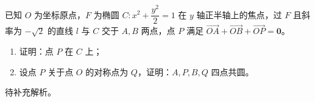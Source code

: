 \begin{prob}[source={2011大纲卷理}, topic={椭圆}, score=12]
已知 $O$ 为坐标原点，$F$ 为椭圆 $C: x^2 + \dfrac{y^2}{2} = 1$ 在 $y$ 轴正半轴上的焦点，过 $F$ 且斜率为 $-\sqrt{2}$ 的直线 $l$ 与 $C$ 交于 $A, B$ 两点，点 $P$ 满足 $\overrightarrow{OA} + \overrightarrow{OB} + \overrightarrow{OP} = \mathbf{0}$。
\begin{enumerate}
	\item[(1)] 证明：点 $P$ 在 $C$ 上；
	\item[(2)] 设点 $P$ 关于点 $O$ 的对称点为 $Q$，证明：$A, P, B, Q$ 四点共圆。
\end{enumerate}
\end{prob}
\begin{prob-sol}
待补充解析。
\end{prob-sol}
